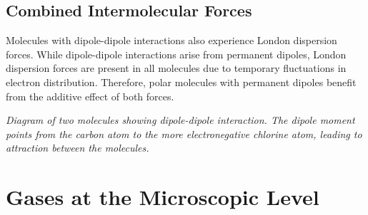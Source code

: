 \documentclass{report}
\begin{document}
\subsection{Combined Intermolecular Forces}

Molecules with dipole-dipole interactions also experience London dispersion forces. While dipole-dipole interactions arise from permanent dipoles, London dispersion forces are present in all molecules due to temporary fluctuations in electron distribution. Therefore, polar molecules with permanent dipoles benefit from the additive effect of both forces.

\begin{center}
\end{center}

\textit{Diagram of two  molecules showing dipole-dipole interaction. The dipole moment points from the carbon atom to the more electronegative chlorine atom, leading to attraction between the molecules.}

\section{Gases at the Microscopic Level}
\end{document}
